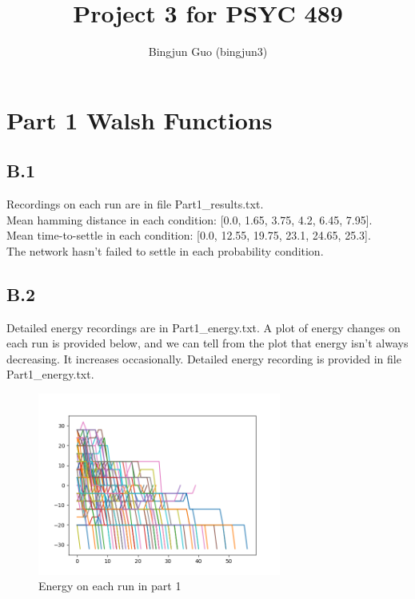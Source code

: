 \documentclass{article}
\title{Project 3 for PSYC 489}
\author{Bingjun Guo (bingjun3)}
\begin{document}
\maketitle
\section*{Part 1 Walsh Functions}
\subsection*{B.1}
Recordings on each run are in file Part1\_results.txt.\\
Mean hamming distance in each condition: [0.0, 1.65, 3.75, 4.2, 6.45, 7.95].\\
Mean time-to-settle in each condition: [0.0, 12.55, 19.75, 23.1, 24.65, 25.3].\\
The network hasn't failed to settle in each probability condition.
\subsection*{B.2}
Detailed energy recordings are in Part1\_energy.txt. A plot of energy changes on each run is provided below, and we can tell from the plot that energy isn't always decreasing. It increases occasionally. Detailed energy recording is provided in file Part1\_energy.txt.
\begin{figure}[h]
    \centering
    \includegraphics[width=8cm]{Part1energy}
    \caption{Energy on each run in part 1}
\end{figure}
\newpage
\end{document}

